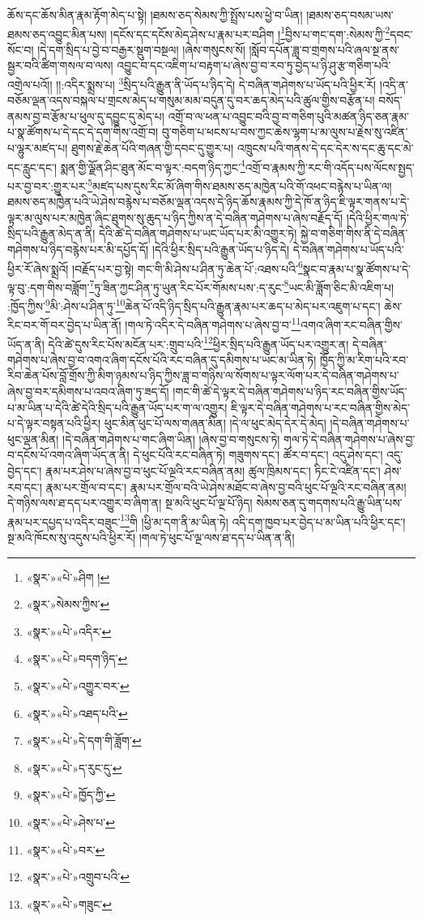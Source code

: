 ཆོས་དང་ཆོས་མིན་རྣམ་རྟོག་མེད་པ་སྟེ། །ཐམས་ཅད་སེམས་ཀྱི་སྤྲོས་པས་ཕྱེ་བ་ཡིན། །ཐམས་ཅད་བསམ་ཡས་ཐམས་ཅད་འབྱུང་མིན་པས། །དངོས་དང་དངོས་མེད་ཤེས་པ་རྣམ་པར་བཤིག །\footnote{«སྣར་»«པེ་»ཤིག །}བྱིས་པ་གང་དག་:སེམས་ཀྱི་\footnote{«སྣར་»སེམས་ཀྱིས་}དབང་སོང་བ། །དེ་དག་སྲིད་པ་བྱེ་བ་བརྒྱར་སྡུག་བསྔལ། །ཞེས་གསུངས་སོ། །སློབ་དཔོན་ཟླ་བ་གྲགས་པའི་ཞལ་སྔ་ནས་སྦྱར་བའི་ཚིག་གསལ་བ་ལས། འབྱུང་བ་དང་འཇིག་པ་བརྟག་པ་ཞེས་བྱ་བ་རབ་ཏུ་བྱེད་པ་ཉི་ཤུ་རྩ་གཅིག་པའི་འགྲེལ་པའོ།། །།:འདིར་སྨྲས་པ། \footnote{«སྣར་»«པེ་»འདིར་}སྲིད་པའི་རྒྱུན་ནི་ཡོད་པ་ཉིད་དེ། དེ་བཞིན་གཤེགས་པ་ཡོད་པའི་ཕྱིར་རོ། །འདི་ན་བཅོམ་ལྡན་འདས་བསྐལ་པ་གྲངས་མེད་པ་གསུམ་མམ་བདུན་དུ་བར་ཆད་མེད་པའི་ཚུལ་གྱིས་བརྩོན་པ། བསོད་ནམས་བྱ་བ་རྩོམ་པ་ཕུལ་དུ་དབྱུང་དུ་མེད་པ། འགྲོ་བ་ལ་ཕན་པ་འབྱུང་བའི་བྱ་བ་གཅིག་པུའི་མཚན་ཉིད་ཅན་རྣམ་པ་སྣ་ཚོགས་པ་དེ་དང་དེ་དག་གིས་འགྲོ་བ། བུ་གཅིག་པ་ཕངས་པ་བས་ཀྱང་ཆེས་ལྷག་པ་མ་ལུས་པ་རྗེས་སུ་འཛིན་པ་ལྷུར་མཛད་པ། ཐུགས་རྗེ་ཆེན་པོའི་གཞན་གྱི་དབང་དུ་གྱུར་པ། འཁྲུངས་པའི་གནས་དེ་དང་དེར་ས་དང་ཆུ་དང་མེ་དང་རླུང་དང་། སྨན་གྱི་ལྗོན་ཤིང་ཐུན་མོང་བ་ལྟར་:བདག་ཉིད་ཀྱང་\footnote{«སྣར་»«པེ་»བདག་ཉིད་}འགྲོ་བ་རྣམས་ཀྱི་རང་གི་འདོད་པས་ལོངས་སྤྱད་པར་བྱ་བར་:གྱུར་པར་\footnote{«སྣར་»«པེ་»འགྱུར་བར་}མཛད་པས་དུས་རིང་མོ་ཞིག་གིས་ཐམས་ཅད་མཁྱེན་པའི་གོ་འཕང་བརྙེས་པ་ཡིན་ལ། ཐམས་ཅད་མཁྱེན་པའི་ཡེ་ཤེས་བརྙེས་པ་བཅོམ་ལྡན་འདས་དེ་ཉིད་ཆོས་རྣམས་ཀྱི་དེ་ཁོ་ན་ཉིད་ཇི་ལྟར་གནས་པ་དེ་ལྟར་མ་ལུས་པར་མཁྱེན་ཞིང་ཐུགས་སུ་ཆུད་པ་ཉིད་ཀྱིས་ན་དེ་བཞིན་གཤེགས་པ་ཞེས་བརྗོད་དོ། །དེའི་ཕྱིར་གལ་ཏེ་སྲིད་པའི་རྒྱུན་མེད་ན་ནི། དེའི་ཚེ་དེ་བཞིན་གཤེགས་པ་ཡང་ཡོད་པར་མི་འགྱུར་ཏེ། སྐྱེ་བ་གཅིག་གིས་ནི་དེ་བཞིན་གཤེགས་པ་ཉིད་བརྙེས་པར་མི་དཔྱོད་དོ། །དེའི་ཕྱིར་སྲིད་པའི་རྒྱུན་ཡོད་པ་ཉིད་དེ། དེ་བཞིན་གཤེགས་པ་ཡོད་པའི་ཕྱིར་རོ་ཞེས་སྨྲའོ། །བརྗོད་པར་བྱ་སྟེ། གང་གི་མི་ཤེས་པ་ཤིན་ཏུ་ཆེན་པོ་:འཐས་པའི་\footnote{«སྣར་»«པེ་»འཐད་པའི་}སྣང་བ་རྣམ་པ་སྣ་ཚོགས་པ་དེ་ལྟ་བུ་:དག་གིས་བཟློག་\footnote{«སྣར་»«པེ་»དེ་དག་གི་ཟློག་}ཏུ་ཟིན་ཀྱང་ཤིན་ཏུ་ཡུན་རིང་པོར་གོམས་པས་:ད་རུང་\footnote{«སྣར་»«པེ་»ད་རུང་དུ་}ཡང་མི་ཟློག་ཅིང་མི་འཇིག་པ། :ཁྱོད་ཀྱིས་\footnote{«སྣར་»«པེ་»ཁྱོད་ཀྱི་}མི་:ཤེས་པ་ཤིན་ཏུ་\footnote{«སྣར་»«པེ་»ཤེས་པ་}ཆེན་པོ་འདི་ཉིད་སྲིད་པའི་རྒྱུན་རྣམ་པར་ཆད་པ་མེད་པར་འཇུག་པ་དང་། ཆེས་རིང་བར་གོ་བར་བྱེད་པ་ཡིན་ནོ། །གལ་ཏེ་འདིར་དེ་བཞིན་གཤེགས་པ་ཞེས་བྱ་བ་\footnote{«སྣར་»«པེ་»བར་}འགའ་ཞིག་རང་བཞིན་གྱིས་ཡོད་ན་ནི། དེའི་ཚེ་དུས་རིང་པོས་མངོན་པར་:གྲུབ་པའི་\footnote{«སྣར་»«པེ་»འགྲུབ་པའི་}ཕྱིར་སྲིད་པའི་རྒྱུན་ཡོད་པར་འགྱུར་ན། དེ་བཞིན་གཤེགས་པ་ཞེས་བྱ་བ་འགའ་ཞིག་དངོས་པོའི་རང་བཞིན་དུ་དམིགས་པ་ཡང་མ་ཡིན་ཏེ། ཁྱོད་ཀྱི་མ་རིག་པའི་རབ་རིབ་ཆེན་པོས་བློ་གྲོས་ཀྱི་མིག་ཉམས་པ་ཉིད་ཀྱིས་ཟླ་བ་གཉིས་ལ་སོགས་པ་ལྟར་ལོག་པར་དེ་བཞིན་གཤེགས་པ་ཞེས་བྱ་བར་དམིགས་པ་འབའ་ཞིག་ཏུ་ཟད་དོ། །གང་གི་ཚེ་དེ་ལྟར་དེ་བཞིན་གཤེགས་པ་ཉིད་རང་བཞིན་གྱིས་ཡོད་པ་མ་ཡིན་པ་དེའི་ཚེ་དེའི་སྲིད་པའི་རྒྱུན་ཡོད་པར་ག་ལ་འགྱུར། ཇི་ལྟར་དེ་བཞིན་གཤེགས་པ་རང་བཞིན་གྱིས་མེད་པ་དེ་ལྟར་བསྟན་པའི་ཕྱིར། ཕུང་མིན་ཕུང་པོ་ལས་གཞན་མིན། །དེ་ལ་ཕུང་མེད་དེར་དེ་མེད། །དེ་བཞིན་གཤེགས་པ་ཕུང་ལྡན་མིན། །དེ་བཞིན་གཤེགས་པ་གང་ཞིག་ཡིན། །ཞེས་བྱ་བ་གསུངས་ཏེ། གལ་ཏེ་དེ་བཞིན་གཤེགས་པ་ཞེས་བྱ་བ་དངོས་པོ་འགའ་ཞིག་ཡོད་ན་ནི། དེ་ཕུང་པོའི་རང་བཞིན་ཏེ། གཟུགས་དང་། ཚོར་བ་དང་། འདུ་ཤེས་དང་། འདུ་བྱེད་དང་། རྣམ་པར་ཤེས་པ་ཞེས་བྱ་བ་ཕུང་པོ་ལྔའི་རང་བཞིན་ནམ། ཚུལ་ཁྲིམས་དང་། ཏིང་ངེ་འཛིན་དང་། ཤེས་རབ་དང་། རྣམ་པར་གྲོལ་བ་དང་། རྣམ་པར་གྲོལ་བའི་ཡེ་ཤེས་མཐོང་བ་ཞེས་བྱ་བའི་ཕུང་པོ་ལྔའི་རང་བཞིན་ནམ། དེ་གཉིས་ལས་ཐ་དད་པར་འགྱུར་བ་ཞིག་ན། སྔ་མའི་ཕུང་པོ་ལྔ་པོ་ཉིད། སེམས་ཅན་དུ་གདགས་པའི་རྒྱུ་ཡིན་པས་རྣམ་པར་དཔྱད་པ་འདིར་བཟུང་\footnote{«སྣར་»«པེ་»གཟུང་}གི །ཕྱི་མ་དག་ནི་མ་ཡིན་ཏེ། འདི་དག་ཁྱབ་པར་བྱེད་པ་མ་ཡིན་པའི་ཕྱིར་དང་། སྔ་མའི་ཁོངས་སུ་འདུས་པའི་ཕྱིར་རོ། །གལ་ཏེ་ཕུང་པོ་ལྔ་ལས་ཐ་དད་པ་ཡིན་ན་ནི། 